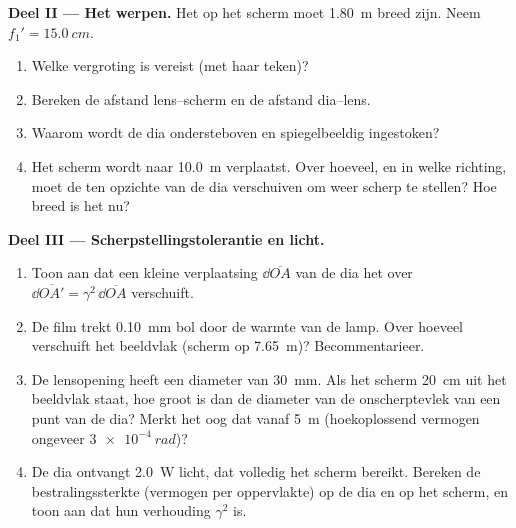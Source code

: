 \begin{problem}
\medskip
\noindent\textbf{Deel II --- Het  werpen.}
Het  op het scherm moet \qty{1.80}{m} breed zijn. Neem
$f_1' = \qty{15.0}{cm}$.
\begin{enumerate}[resume]
  \item Welke vergroting is vereist (met haar teken)?
  \item Bereken de afstand lens--scherm en de afstand dia--lens.
  \item Waarom wordt de dia ondersteboven en spiegelbeeldig ingestoken?
  \item Het scherm wordt naar \qty{10.0}{m} verplaatst. Over hoeveel, en in
        welke richting, moet de  ten opzichte van de dia verschuiven om
        weer scherp te stellen? Hoe breed is het  nu?
\end{enumerate}

\medskip
\noindent\textbf{Deel III --- Scherpstellingstolerantie en licht.}
\begin{enumerate}[resume]
  \item Toon aan dat een kleine verplaatsing $\dd\overline{OA}$ van de dia
        het  over $\dd\overline{OA'} = \gamma^2\,\dd\overline{OA}$ verschuift.
  \item De film trekt \qty{0.10}{mm} bol door de warmte van de lamp. Over
        hoeveel verschuift het beeldvlak (scherm op \qty{7.65}{m})?
        Becommentarieer.
  \item De lensopening heeft een diameter van \qty{30}{mm}. Als het scherm
        \qty{20}{cm} uit het beeldvlak staat, hoe groot is dan de diameter
        van de onscherptevlek van een punt van de dia? Merkt het oog dat
        vanaf \qty{5}{m} (hoekoplossend vermogen ongeveer $\qty{3e-4}{rad}$)?
  \item De dia ontvangt \qty{2.0}{W} licht, dat volledig het scherm bereikt.
        Bereken de bestralingssterkte (vermogen per oppervlakte) op de dia
        en op het scherm, en toon aan dat hun verhouding $\gamma^2$ is.
\end{enumerate}


\end{problem}
